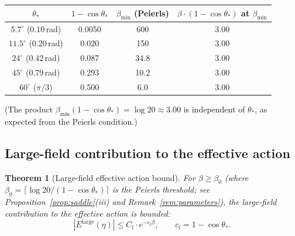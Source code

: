 \documentclass[11pt]{article}
\newtheorem{theorem}{Theorem}[section]
\theoremstyle{definition}
\begin{document}
\begin{center}
\begin{tabular}{cccc}
\toprule
$\theta_*$ & $1-\cos\theta_*$ & $\beta_{\min}$ (Peierls) &
$\beta\cdot(1-\cos\theta_*)$ at $\beta_{\min}$\\
\midrule
$5.7^\circ$ (0.10\,rad) & 0.0050 & 600 & 3.00\\
$11.5^\circ$ (0.20\,rad) & 0.020 & 150 & 3.00\\
$24^\circ$ (0.42\,rad) & 0.087 & 34.8 & 3.00\\
$45^\circ$ (0.79\,rad) & 0.293 & 10.2 & 3.00\\
$60^\circ$ ($\pi/3$) & 0.500 & 6.0 & 3.00\\
\bottomrule
\end{tabular}
\end{center}

\noindent (The product $\beta_{\min}(1-\cos\theta_*)=\log 20\approx 3.00$
is independent of $\theta_*$, as expected from the Peierls condition.)

\subsection{Large-field contribution to the effective action}
\label{subsec:LFeff}

\begin{theorem}[Large-field effective action bound]\label{thm:largefield}
For $\beta\ge\beta_0$ (where $\beta_0=\lceil\log 20/(1-\cos\theta_*)\rceil$
is the Peierls threshold; see Proposition~\ref{prop:saddle}(iii)
and Remark~\ref{rem:parameters}), the large-field contribution to the
effective action is bounded:
\begin{equation}
|E^{\mathrm{large}}(\eta)|\le C_l\cdot e^{-c_l\beta},
\qquad c_l=1-\cos\theta_*.
\end{equation}
\end{theorem}
\end{document}
